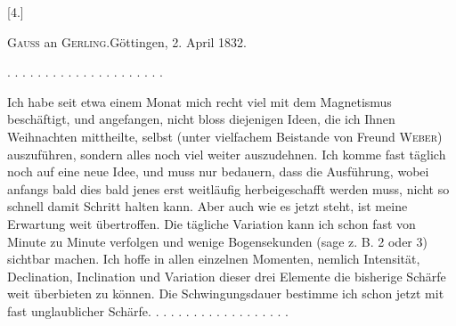 \clearpage\begingroup{}
\begin{center}[4.]\end{center}
\begin{center}\textsc{Gauss} an \textsc{Gerling}.\quad Göttingen, 2. April 1832.\end{center}
\noindent . . . . . . . . . . . . . . . . . . . . .\par
\indent Ich habe seit etwa einem Monat mich recht viel mit dem Magnetismus
beschäftigt, und angefangen, nicht bloss diejenigen Ideen, die ich Ihnen Weihnachten
mittheilte, selbst (unter vielfachem Beistande von Freund \textsc{Weber}) auszuführen,
sondern alles noch viel weiter auszudehnen. Ich komme fast täglich
noch auf eine neue Idee, und muss nur bedauern, dass die Ausführung, wobei
anfangs bald dies bald jenes erst weitläufig herbeigeschafft werden muss, nicht
so schnell damit Schritt halten kann. Aber auch wie es jetzt steht, ist meine
Erwartung weit übertroffen. Die tägliche Variation kann ich schon fast von
Minute zu Minute verfolgen und wenige Bogensekunden (sage z. B. 2 oder 3)
 sichtbar machen. Ich hoffe in allen einzelnen Momenten, nemlich
Intensität, Declination, Inclination und Variation dieser drei Elemente die bisherige
Schärfe weit überbieten zu können. Die Schwingungsdauer bestimme
ich schon jetzt mit fast unglaublicher Schärfe. . . . . . . . . . . . . . . . . . .
\clearpage\endgroup
